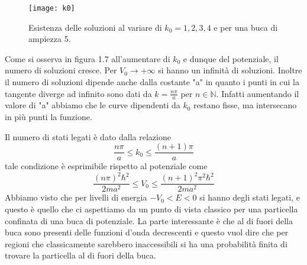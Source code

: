 \newpage 
 
\begin{figure}[!ht]
\vspace{0.1in}
\texttt{[image: k0]}	
\centering
\vspace{0.1in}
\caption{Esistenza delle soluzioni al variare di $k_0 = 1,2,3,4$ e per una buca di ampiezza 5.}
\end{figure}
Come si osserva in figura 1.7 all'aumentare di $k_0$ e dunque del potenziale, il numero di soluzioni cresce. Per $V_0 \to + \infty$ si hanno un infinit\`a di soluzioni. Inoltre il numero di soluzioni dipende anche dalla costante "a" in quanto i punti in cui la tangente diverge ad infinito sono dati da $ k = \frac{n\pi}{a}$ per $n \in \mathbb{N}$. Infatti aumentando il valore di "a" abbiamo che le curve dipendenti da $k_0$ restano fisse, ma intersecano in pi\`u punti la funzione.
\newline

\noindent Il numero di stati legati \`e dato dalla relazione 
\begin{equation*}
	\frac{n\pi}{a} \leq k_0 \leq \frac{(n+1)\pi}{a}
\end{equation*} 
tale condizione \`e esprimibile rispetto al potenziale come
\begin{equation*}
	\frac{(n \pi)^2 \hbar^2 }{2ma^2} \leq V_0 \leq \frac{(n+1)^2 \pi^2 \hbar^2}{2ma^2}
\end{equation*}
Abbiamo visto che per livelli di energia $-V_0<E<0$ si hanno degli stati legati, e questo \`e quello che ci aspettiamo da un punto di vista classico per una particella confinata di una buca di potenziale. La parte interessante \`e che al di fuori della buca sono presenti delle funzioni d'onda decrescenti e questo vuol dire che per regioni che classicamente sarebbero inaccessibili si ha una probabilit\`a finita di trovare la particella al di fuori della buca.
\newpage 

